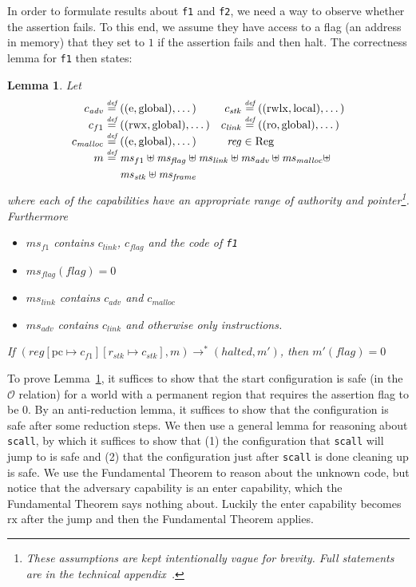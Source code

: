 \documentclass[compsoc,conference,letterpaper,fleqn]{IEEEtran}
\newtheorem{lemma}{Lemma}
\newcommand{\update}[2]{[#1 \mapsto #2]}
\newcommand{\defeq}{\stackrel{\textit{\tiny{def}}}{=}}
\newcommand{\var}[1]{\mathit{#1}}
\newcommand{\hs}{\var{ms}}
\newcommand{\ms}{\hs}
\newcommand{\pcreg}{\mathrm{pc}}
\newcommand{\reg}{\var{reg}}
\newcommand{\adv}{\var{adv}}
\newcommand{\link}{\var{link}}
\newcommand{\stk}{\var{stk}}
\newcommand{\flag}{\var{flag}}
\newcommand{\halted}{\mathit{halted}}
\newcommand{\codelabel}[1]{\mathit{#1}}
\newcommand{\malloc}{\codelabel{malloc}}
\newcommand{\plaindom}[1]{\mathrm{#1}}
\newcommand{\Regs}{\plaindom{Reg}}
\newcommand{\observations}{\mathcal{O}}
\newcommand{\plainperm}[1]{\mathrm{#1}}
\newcommand{\readonly}{\plainperm{ro}}
\newcommand{\exec}{\plainperm{rx}}
\newcommand{\entry}{\plainperm{e}}
\newcommand{\rwx}{\plainperm{rwx}}
\newcommand{\rwlx}{\plainperm{rwlx}}
\newcommand{\local}{\plainperm{local}}
\newcommand{\glob}{\plainperm{global}}
\newcommand{\step}[1][]{\rightarrow_{#1}}
\begin{document}
In order to formulate results about \texttt{\footnotesize{f1}} and
\texttt{\footnotesize{f2}}, we need a way to observe whether the assertion
fails. To this end, we assume they have access to a flag (an address in memory)
that they set to $1$ if the assertion fails and then halt. The correctness lemma
for \texttt{\footnotesize{f1}} then states:
\begin{lemma}
  \label{lem:correctness-f1}
  Let
\[
    \begin{array}{r@{}lr@{}l}
    c_{\var{adv}} & \;\defeq ((\entry,\glob),\dots) & c_{\var{stk}} & \;\defeq ((\rwlx,\local),\dots)\\
    c_{f1} & \;\defeq ((\rwx,\glob),\dots) & c_\link &\; \defeq ((\readonly,\glob),\dots)\\
    c_\malloc &\; \defeq ((\entry,\glob),\dots) & \reg& \; \in \Regs \\
    m &  \multicolumn{3}{@{}l}{\;\defeq \ms_{f1} \uplus \ms_\flag \uplus \ms_{\var{link}} \uplus \hs_\adv \uplus \ms_{\malloc} \uplus} \\
      & \multicolumn{3}{@{}l}{\phantom{\;\defeq \;}  \ms_{\var{stk}} \uplus \ms_{\var{frame}}} \\
    \end{array}
\]
where each of the capabilities have an appropriate range of authority and
pointer\footnote{These assumptions are kept intentionally vague for brevity.
  Full statements are in the technical appendix~\citep{technical_appendix}.}.
Furthermore
  \begin{itemize}
  \item $\ms_{f1}$ contains $c_\link$, $c_\flag$ and the code of \texttt{\footnotesize{f1}}
  \item $\ms_\flag(\flag) = 0$
  \item $\ms_{\var{link}}$ contains $c_\adv$ and $c_\malloc$
  \item $\hs_\adv$ contains $c_\link$ and otherwise only instructions.
  \end{itemize}
  If $(\reg\update{\pcreg}{c_{f1}}\update{r_\stk}{c_\stk},m) \step^* (\halted,m')$,
  then $m'(\flag) = 0$
\end{lemma}

To prove Lemma~\ref{lem:correctness-f1}, it suffices to show that the start
configuration is safe (in the $\observations$ relation) for a world with a
permanent region that requires the assertion flag to be 0. By an anti-reduction
lemma, it suffices to show that the configuration is safe after some reduction
steps. We then use a general lemma for reasoning about
\texttt{\footnotesize{scall}}, by which it suffices to show that (1) the
configuration that \texttt{\footnotesize{scall}} will jump to is safe and (2)
that the configuration just after \texttt{\footnotesize{scall}} is done cleaning
up is safe. We use the Fundamental Theorem to reason about the unknown code, but
notice that the adversary capability is an enter capability, which the
Fundamental Theorem says nothing about. Luckily the enter capability becomes
$\exec$ after the jump and then the Fundamental Theorem applies.
\end{document}
